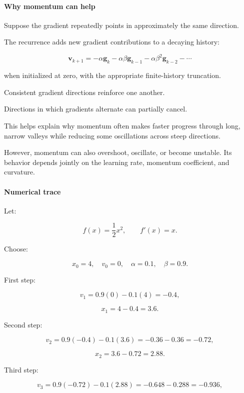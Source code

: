 \paragraph{Why momentum can help}\label{02-foundations-ii-ch026-why-momentum-can-help}

\hypertarget{02-foundations-ii-ch026-why-momentum-can-help}{}

Suppose the gradient repeatedly points in approximately the same direction.

The recurrence adds new gradient contributions to a decaying history:

\[
\mathbf v_{k+1} = -\alpha\mathbf g_k -\alpha\beta\mathbf g_{k-1} -\alpha\beta^2\mathbf g_{k-2} -\cdots
\]

when initialized at zero, with the appropriate finite-history truncation.

Consistent gradient directions reinforce one another.

Directions in which gradients alternate can partially cancel.

This helps explain why momentum often makes faster progress through long, narrow valleys while reducing some oscillations across steep directions.

However, momentum can also overshoot, oscillate, or become unstable. Its behavior depends jointly on the learning rate, momentum coefficient, and curvature.

\paragraph{Numerical trace}\label{02-foundations-ii-ch026-numerical-trace}

\hypertarget{02-foundations-ii-ch026-numerical-trace}{}

Let:

\[
f(x)=\frac12x^2,\qquad f'(x)=x.
\]

Choose:

\[
x_0=4,\quad v_0=0,\quad\alpha=0.1,\quad\beta=0.9.
\]

First step:

\[
v_1=0.9(0)-0.1(4)=-0.4,
\]

\[
x_1=4-0.4=3.6.
\]

Second step:

\[
v_2=0.9(-0.4)-0.1(3.6) =-0.36-0.36=-0.72,
\]

\[
x_2=3.6-0.72=2.88.
\]

Third step:

\[
v_3=0.9(-0.72)-0.1(2.88) =-0.648-0.288=-0.936,
\]

